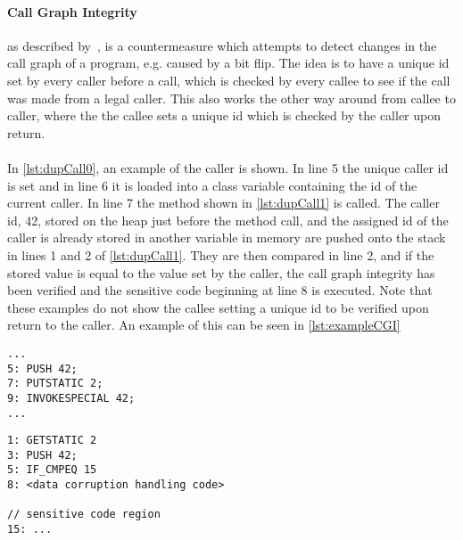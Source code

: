 \paragraph{Call Graph Integrity} as described by~\cite[p. 12]{javasec}, is a countermeasure which attempts to detect changes in the call graph of a program, e.g. caused by a bit flip. The idea is to have a unique id set by every caller before a call, which is checked by every callee to see if the call was made from a legal caller. This also works the other way around from callee to caller, where the the callee sets a unique id which is checked by the caller upon return.\\\\
In \cref{lst:dupCall0}, an example of the caller is shown. In line 5 the unique caller id is set and in line 6 it is loaded into a class variable containing the id of the current caller. In line 7 the method shown in \cref{lst:dupCall1} is called. The caller id, 42, stored on the heap just before the method call, and the assigned id of the caller is already stored in another variable in memory are pushed onto the stack in lines 1 and 2 of \ref{lst:dupCall1}. They are then compared in line 2, and if the stored value is equal to the value set by the caller, the call graph integrity has been verified and the sensitive code beginning at line 8 is executed. Note that these examples do not show the callee setting a unique id to be verified upon return to the caller. An example of this can be seen in \cref{lst:exampleCGI}

\begin{minipage}{\linewidth}
\begin{lstlisting}[caption={Caller with call graph integrity implemented. The code is written in \jcl. Note that for simplicity, the numbers in the left side are line numbers and do not denote the program counter values.}, label={lst:dupCall0}]
...
5: PUSH 42; 
7: PUTSTATIC 2;
9: INVOKESPECIAL 42;
...
\end{lstlisting}
\end{minipage}

\begin{minipage}{\linewidth}
\begin{lstlisting}[caption={Callee with call graph integrity implemented. The code is written in \jcl. Note that for simplicity, the numbers in the left side are line numbers and do not denote the program counter values.}, label={lst:dupCall1}]
1: GETSTATIC 2
3: PUSH 42;
5: IF_CMPEQ 15
8: <data corruption handling code>

// sensitive code region
15: ...
\end{lstlisting}
\end{minipage}